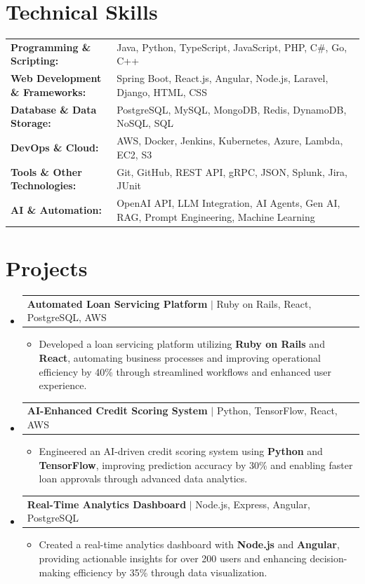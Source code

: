 \documentclass[letterpaper,10pt]{article}
\makeatletter
\newcommand{\resumeItem}[1]{
  \item{\fontsize{8pt}{9pt}\selectfont
    #1 \vspace{-3pt}
  }
}
\newcommand{\resumeProjectHeading}[2]{
    \item
    \begin{tabular*}{1.001\textwidth}{l@{\extracolsep{\fill}}r}
      \fontsize{8.5pt}{10pt}#1 & \textbf{\fontsize{8.5pt}{10pt} #2}\\
    \end{tabular*}\vspace{-7pt}
}
\newcommand{\resumeSubHeadingListStart}{\begin{itemize}[leftmargin=0pt, label={}]}
\newcommand{\resumeSubHeadingListEnd}{\end{itemize}}
\newcommand{\resumeItemListStart}{\begin{itemize}[leftmargin=*]}
\newcommand{\resumeItemListEnd}{\end{itemize}\vspace{-5pt}}
\makeatother
\begin{document}
\section{Technical Skills}
        \vspace{-14pt}
        \begin{table}[h]
            \fontsize{8pt}{9pt}\selectfont
            \begin{tabular}{p{0.3\linewidth} p{0.7\linewidth}}
                \textbf{Programming \& Scripting:} & Java, Python, TypeScript, JavaScript, PHP, C\#, Go, C++ \\
                \textbf{Web Development \& Frameworks:} & Spring Boot, React.js, Angular, Node.js, Laravel, Django, HTML, CSS \\
                \textbf{Database \& Data Storage:} & PostgreSQL, MySQL, MongoDB, Redis, DynamoDB, NoSQL, SQL \\
                \textbf{DevOps \& Cloud:} & AWS, Docker, Jenkins, Kubernetes, Azure, Lambda, EC2, S3 \\
                \textbf{Tools \& Other Technologies:} & Git, GitHub, REST API, gRPC, JSON, Splunk, Jira, JUnit \\
                \textbf{AI \& Automation:} & OpenAI API, LLM Integration, AI Agents, Gen AI, RAG, Prompt Engineering, Machine Learning \\
            \end{tabular}
        \end{table}
 \vspace{-18pt}

\section{Projects}
    \vspace{-5pt}
    \resumeSubHeadingListStart
          \resumeProjectHeading
            {\textbf{Automated Loan Servicing Platform} $|$ Ruby on Rails, React, PostgreSQL, AWS}{}
            \resumeItemListStart
                \resumeItem{Developed a loan servicing platform utilizing \textbf{Ruby on Rails} and \textbf{React}, automating business processes and improving operational efficiency by 40\% through streamlined workflows and enhanced user experience.}
            \resumeItemListEnd
        \vspace{-12pt}
    
        \resumeProjectHeading
            {\textbf{AI-Enhanced Credit Scoring System} $|$ Python, TensorFlow, React, AWS}{}
        \resumeItemListStart
                \resumeItem{Engineered an AI-driven credit scoring system using \textbf{Python} and \textbf{TensorFlow}, improving prediction accuracy by 30\% and enabling faster loan approvals through advanced data analytics.}
        \resumeItemListEnd
      \vspace{-12pt}
      \resumeProjectHeading
        {\textbf{Real-Time Analytics Dashboard} $|$ Node.js, Express, Angular, PostgreSQL}{}
    \resumeItemListStart
            \resumeItem{Created a real-time analytics dashboard with \textbf{Node.js} and \textbf{Angular}, providing actionable insights for over 200 users and enhancing decision-making efficiency by 35\% through data visualization.}
    \resumeItemListEnd
    \resumeSubHeadingListEnd
\end{document}
